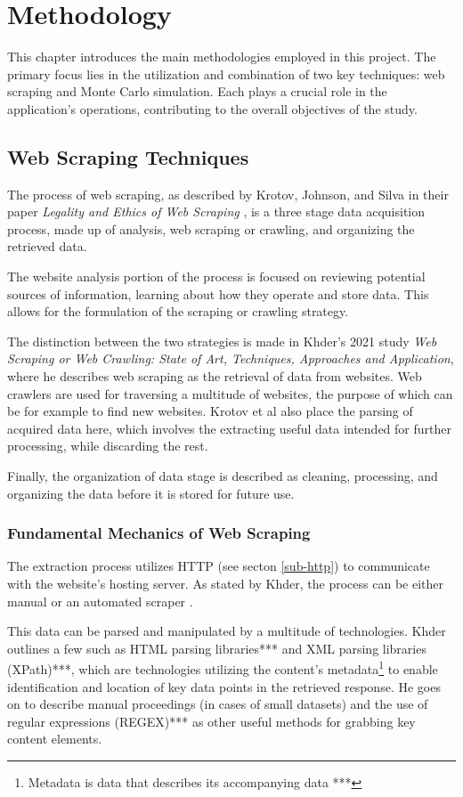 \documentclass{thesis-ekf}
\theoremstyle{definition}
\theoremstyle{remark}
\begin{document}
\chapter{Methodology}
This chapter introduces the main methodologies employed in this project. The primary focus lies in the utilization and combination of two key techniques: web scraping and Monte Carlo simulation. Each plays a crucial role in the application's operations, contributing to the overall objectives of the study.

\section{Web Scraping Techniques}
The process of web scraping, as described by Krotov, Johnson, and Silva in their paper \emph{Legality and Ethics of Web Scraping} \cite{Krotov}, is a three stage data acquisition process, made up of analysis, web scraping or crawling, and organizing the retrieved data. 

The website analysis portion of the process is focused on reviewing potential sources of information, learning about how they operate and store data. This allows for the formulation of the scraping or crawling strategy.

The distinction between the two strategies is made in Khder's 2021 study \emph{Web Scraping or Web Crawling: State of Art, Techniques, Approaches and	Application}, where he describes web scraping as the retrieval of data from websites. Web crawlers are used for traversing a multitude of websites, the purpose of which can be for example to find new websites. Krotov et al also place the parsing of acquired data here, which involves the extracting useful data intended for further processing, while discarding the rest. 

Finally, the organization of data stage is described as cleaning, processing, and organizing the data before it is stored for future use.

\subsection{Fundamental Mechanics of Web Scraping}
The extraction process utilizes HTTP (see secton \ref{sub-http}) to communicate with the website's hosting server. As stated by Khder, the process can be either manual or an automated scraper \cite{Khder}. 

This data can be parsed and manipulated by a multitude of technologies. Khder outlines a few such as HTML parsing libraries*** and XML parsing libraries (XPath)***, which are technologies utilizing the content's metadata\footnote{Metadata is data that describes its accompanying data ***} to enable identification and location of key data points in the retrieved response. He goes on to describe manual proceedings (in cases of small datasets) and the use of regular expressions (REGEX)*** as other useful methods for grabbing key content elements.
\end{document}
